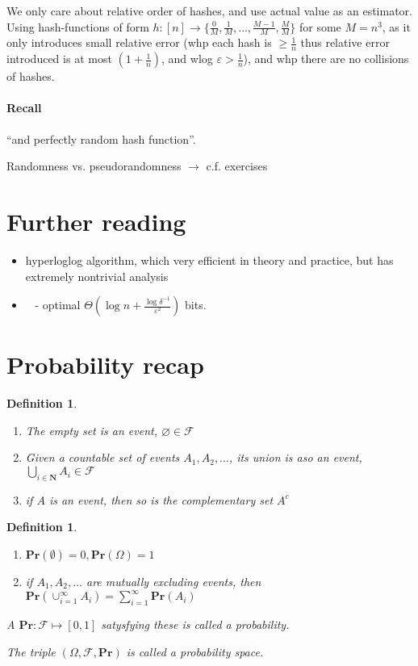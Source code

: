 \documentclass[11pt]{article}
\newcommand{\Ppb}{\mathbf{Pr}}
\newcommand{\sF}{\mathcal{F}}
\newcommand{\Nat}{\mathbf{N}}
\newtheorem{definition}[theorem]{Definition}
\begin{document}
We only care about relative order of hashes, and use actual value as an estimator. Using hash-functions of form $h: [n] \rightarrow \{\frac{0}{M}, \frac{1}{M}, \dots, \frac{M-1}{M}, \frac{M}{M}\}$ for some $M = n^3$, as it only introduces small relative error (whp each hash is $\geq \frac{1}{n}$ thus relative error introduced is at most $(1+\frac{1}{n})$, and wlog $\varepsilon>\frac{1}{n}$), and whp there are no collisions of hashes.

\paragraph{Recall} ``and perfectly random hash function''.

Randomness vs. pseudorandomness $\rightarrow$ c.f. exercises

\section{Further reading}
\begin{itemize}
    \item hyperloglog algorithm, which very efficient in theory and practice, but has extremely nontrivial analysis \cite{DBLP:conf/esa/DurandF03} \cite{DBLP:conf/edbt/HeuleNH13}
    \item\ \cite{DBLP:conf/soda/Blasiok18} - optimal $\Theta(\log{n} + \frac{\log{\delta^{-1}}}{\varepsilon^2})$ bits.

\end{itemize}
\appendix
\section{Probability recap}
\begin{definition}
\begin{enumerate}
    \item The empty set is an event, $\varnothing \in \sF$
    \item Given a countable set of events $A_1, A_2, \dots$, its union is aso an event, $\bigcup_{i\in\Nat}A_i \in \sF$
    \item if $A$ is an event, then so is the complementary set $A^c$
\end{enumerate}
\end{definition}

\begin{definition}
\begin{enumerate}
    \item $\Ppb(\emptyset)=0, \Ppb(\Omega)=1$
    \item if $A_1, A_2, \dots$ are mutually excluding events, then $\Ppb\left(\cup_{i=1}^{\infty} A_{i}\right)=\sum_{i=1}^{\infty} \Ppb\left(A_{i}\right)$
\end{enumerate}
A $\Ppb: \mathcal{F} \mapsto[0,1]$ satysfying these is called a probability.

The triple $(\Omega, \mathcal{F}, \Ppb)$ is called a probability space.
\end{definition}
\end{document}
